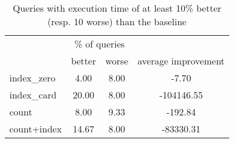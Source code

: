 \documentclass[preview]{standalone}
\begin{document}
 
\begin{table}[!ht] 
\centering 
\begin{tabular}{lccc} 
& \multicolumn{2}{c}{\% of queries} \\\cline{2-3}& better & worse & average improvement \\ \hline 
index\_zero & 4.00 & 8.00 & -7.70 \\ 
 index\_card & 20.00 & 8.00 & -104146.55 \\ 
 count & 8.00 & 9.33 & -192.84 \\ 
 count+index & 14.67 & 8.00 & -83330.31 \\ 
 \end{tabular} 
\caption{Queries with execution time of at least 10\% better (resp. 10 worse) than the baseline}
\end{table} 
\end{document}
